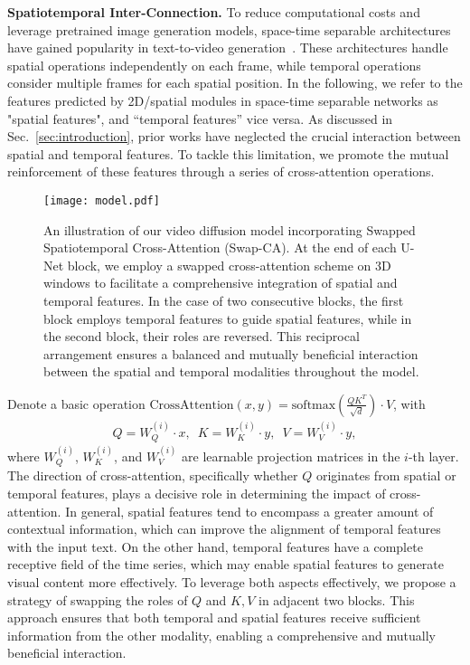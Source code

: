 \documentclass{article}
\begin{document}
\label{sec:method}

\noindent\textbf{Spatiotemporal Inter-Connection.} To reduce computational costs and leverage pretrained image generation models, space-time separable architectures have gained popularity in text-to-video generation~\cite{2022_VDM,2023CogVideo}.
These architectures handle spatial operations independently on each frame, while temporal operations consider multiple frames for each spatial position. 
In the following, we refer to the features predicted by 2D/spatial modules in space-time separable networks as "spatial features", and ``temporal features'' vice versa.
As discussed in Sec.~\ref{sec:introduction}, prior works have neglected the crucial interaction between spatial and temporal features.
To tackle this limitation, we promote the mutual reinforcement of these features through a series of cross-attention operations.










\begin{figure}[t]
    \centering
    \texttt{[image: model.pdf]}
    \caption{An illustration of our video diffusion model incorporating Swapped Spatiotemporal Cross-Attention (Swap-CA). At the end of each U-Net block, we employ a swapped cross-attention scheme on 3D windows to facilitate a comprehensive integration of spatial and temporal features. In the case of two consecutive blocks, the first block employs temporal features to guide spatial features, while in the second block, their roles are reversed. This reciprocal arrangement ensures a balanced and mutually beneficial interaction between the spatial and temporal modalities throughout the model.}
    \label{fig:win_attn}
\end{figure}

Denote a basic operation $\text{CrossAttention}(x,y)=\text{softmax}(\frac {QK^{T}} {\sqrt{d}})\cdot V$, with
\begin{align}
    Q = W^{(i)}_Q \cdot x, \;\ 
    K = W^{(i)}_K \cdot y, \;\ 
    V = W^{(i)}_V \cdot y,
\label{eq:cross_attn}
\end{align}
where $W^{(i)}_Q$, $W^{(i)}_K$, and $W^{(i)}_V$ are learnable projection matrices in the $i$-th layer.
The direction of cross-attention, specifically whether $Q$ originates from spatial or temporal features, plays a decisive role in determining the impact of cross-attention.
In general, spatial features tend to encompass a greater amount of contextual information, which can improve the alignment of temporal features with the input text. On the other hand, temporal features have a complete receptive field of the time series, which may enable spatial features to generate visual content more effectively.
To leverage both aspects effectively, we propose a strategy of swapping the roles of $Q$ and $K,V$ in adjacent two blocks. This approach ensures that both temporal and spatial features receive sufficient information from the other modality, enabling a comprehensive and mutually beneficial interaction.
\end{document}
